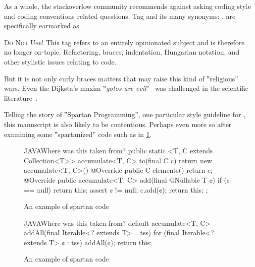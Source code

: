 As a whole, the stackoverlow community
recommends against asking coding style and coding conventions related questions.
Tag  and its many synonyms: ,
 are specifically
earmarked as

\begin{tcolorbox}[colback=green!5!white,colframe=blue!25!white,notitle]
    \textsc{Do Not Use!} 
This tag refers to an entirely opinionated subject and is therefore
no longer on-topic. Refactoring, braces, indentation, Hungarian notation, and
other stylistic issues relating to code.
\end{tcolorbox}

But it is not only curly braces matters that may raise
this kind of ‟religious” wars. Even the Dijksta's maxim ‟\emph{gotos
are evil}”~\cite{Dijksta:must be in bib} was challenged in the scientific
literature~\cite{Knuth: and there are several others}.

Telling the story of ‟Spartan Programming”, one particular style guideline for
\Java, this manuscript is also likely to be contentious. Perhaps even more so
after examining some ‟spartanized” code such as in \cref{figure:first}. 

\begin{figure}[h]
\label{figure:first}
\caption{An example of spartan code}
  \begin{Code}{JAVA}{Where was this taken from?}
public static <T, C extends Collection<T>> accumulate<T, C> 
  to(final C c) {
    return new accumulate<T, C>() {
      @Override public C elements() {
        return c;
      }
      @Override public accumulate<T, C> 
        add(final @Nullable T ¢) {
          if (¢ == null)
            return this;
          assert ¢ != null;
          c.add(¢);
          return this;
        }
    };
  }
\end{Code}
\end{figure}

\begin{figure}[h]
\begin{Code}{JAVA}{Where was this taken from?}
default accumulate<T, C> 
    addAll(final Iterable<? extends T>... tss) {
      for (final Iterable<? extends T> ¢ : tss)
        addAll(¢);
      return this;
    }
\end{Code}
\label{figure:shock-2}
\caption{An example of spartan code}
\end{figure}

